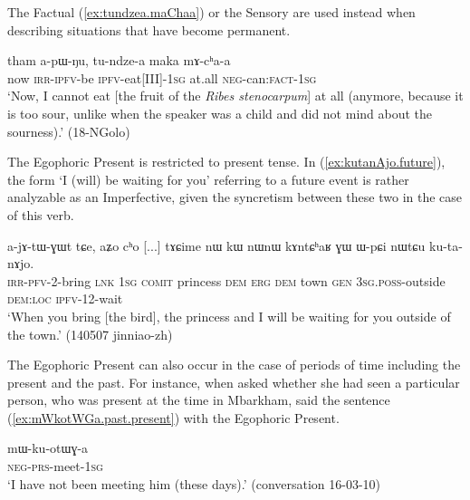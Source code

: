 The Factual (\ref{ex:tundzea.maChaa}) or the Sensory are used instead when describing situations that have become permanent.

\begin{exe}
\ex \label{ex:tundzea.maChaa}
\gll  tham a-pɯ-ŋu, tu-ndze-a maka mɤ-cʰa-a \\
now \textsc{irr}-\textsc{ipfv}-be \textsc{ipfv}-eat[III]-\textsc{1sg} at.all \textsc{neg}-can:\textsc{fact}-\textsc{1sg} \\
\glt `Now, I cannot eat [the fruit of the \textit{Ribes stenocarpum}] at all (anymore, because it is too sour, unlike when the speaker was a child and did not mind about the sourness).' (18-NGolo)
\end{exe}

The Egophoric Present is restricted to present tense. In (\ref{ex:kutanAjo.future}), the form  `I (will) be waiting for you' referring to a future event is rather analyzable as an Imperfective, given the syncretism between these two in the case of this verb.

\begin{exe}
\ex \label{ex:kutanAjo.future}
\gll a-jɤ-tɯ-ɣɯt tɕe, aʑo cʰo [...] tɤɕime nɯ kɯ nɯnɯ kɤntɕʰaʁ ɣɯ ɯ-pɕi nɯtɕu ku-ta-nɤjo. \\
\textsc{irr}-\textsc{pfv}-2-bring \textsc{lnk} \textsc{1sg} \textsc{comit} { } princess \textsc{dem} \textsc{erg} \textsc{dem} town \textsc{gen} \textsc{3sg}.\textsc{poss}-outside \textsc{dem}:\textsc{loc} \textsc{ipfv}-1\fl{}2-wait \\
\glt `When you bring [the bird], the princess and I will be waiting for you outside of the town.' (140507 jinniao-zh)
\end{exe}

The Egophoric Present can also occur in the case of periods of time including the present and the past. For instance, when asked whether she had seen a particular person, who was present at the time in Mbarkham,  said the sentence (\ref{ex:mWkotWGa.past.present}) with the Egophoric Present.

\begin{exe}
\ex \label{ex:mWkotWGa.past.present}
\gll mɯ-ku-otɯɣ-a \\
\textsc{neg}-\textsc{prs}-meet-\textsc{1sg} \\
\glt `I have not been meeting him (these days).' (conversation 16-03-10)
\end{exe} 

